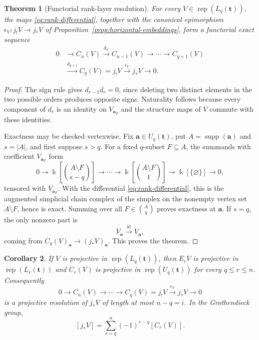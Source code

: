 \documentclass[12pt,reqno]{amsart}
\newtheorem{theorem}{Theorem}[section]
\newtheorem{corollary}[theorem]{Corollary}
\theoremstyle{definition}
\theoremstyle{remark}
\newcommand{\Rep}{\operatorname{rep}}
\begin{document}
\begin{theorem}[Functorial rank-layer resolution]\label{thm:rank-layer-resolution}
For every $V\in\Rep(L_q(\mathbf t))$, the maps \eqref{eq:rank-differential}, together with the canonical epimorphism
$\epsilon_V:j_!V\to j_*V$ of Proposition~\ref{prop:horizontal-embeddings}, form a functorial exact sequence
\begin{equation}\label{eq:rank-layer-resolution}
\boxed{
\begin{aligned}
0&\longrightarrow C_n(V)\xrightarrow{d_n}C_{n-1}(V)
\longrightarrow\cdots\longrightarrow C_{q+1}(V)\\
&\xrightarrow{d_{q+1}}C_q(V)=j_!V
\xrightarrow{\epsilon_V}j_*V\longrightarrow0.
\end{aligned}}
\end{equation}
\end{theorem}

\begin{proof}
The sign rule gives $d_{r-1}d_r=0$, since deleting two distinct elements in the two possible orders produces opposite signs.  Naturality follows because every component of $d_r$ is an identity on $V_{\mathbf a_F}$ and the structure maps of $V$ commute with these identities.

Exactness may be checked vertexwise.  Fix $\mathbf a\in U_q(\mathbf t)$, put $A=\operatorname{supp}(\mathbf a)$ and $s=|A|$, and first suppose $s>q$.  For a fixed $q$-subset $F\subseteq A$, the summands with coefficient $V_{\mathbf a_F}$ form
\[
0\longrightarrow
\Bbbk\!\left[\binom{A\setminus F}{s-q}\right]\longrightarrow\cdots\longrightarrow
\Bbbk\!\left[\binom{A\setminus F}{1}\right]\longrightarrow
\Bbbk\!\left[\{\varnothing\}\right]\longrightarrow0,
\]
tensored with $V_{\mathbf a_F}$.  With the differential \eqref{eq:rank-differential}, this is the augmented simplicial chain complex of the simplex on the nonempty vertex set $A\setminus F$, hence is exact.  Summing over all $F\in\binom{A}{q}$ proves exactness at $\mathbf a$.  If $s=q$, the only nonzero part is
\[
V_{\mathbf a}\xrightarrow{\mathrm{id}}V_{\mathbf a},
\]
coming from $C_q(V)_{\mathbf a}\to(j_*V)_{\mathbf a}$.  This proves the theorem.
\end{proof}

\begin{corollary}\label{cor:projective-rank-resolution}
If $V$ is projective in $\Rep(L_q(\mathbf t))$, then $E_rV$ is projective in
$\Rep(L_r(\mathbf t))$ and $C_r(V)$ is projective in
$\Rep(U_q(\mathbf t))$ for every $q\le r\le n$.  Consequently
\[
0\longrightarrow C_n(V)\longrightarrow\cdots\longrightarrow C_q(V)=j_!V
\xrightarrow{\epsilon_V}j_*V\longrightarrow0
\]
is a projective resolution of $j_*V$ of length at most $n-q=i$.  In the
Grothendieck group,
\[
[j_*V]=\sum_{r=q}^{n}(-1)^{r-q}[C_r(V)].
\]
\end{corollary}
\end{document}
